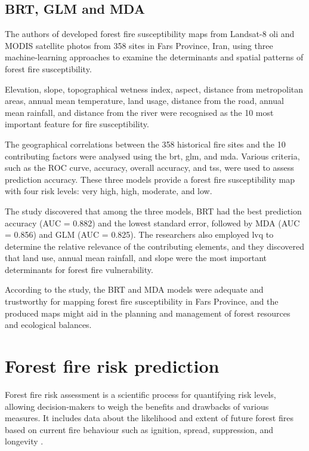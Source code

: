 \subsection{BRT, GLM and MDA}


The authors of \cite{POURGHASEMI2020109321} developed forest fire susceptibility maps from Landsat-8 \gls{oli} and MODIS satellite photos from 358 sites in Fars Province, Iran, using three machine-learning approaches to examine the determinants and spatial patterns of forest fire susceptibility.


Elevation, slope, topographical wetness index, aspect, distance from metropolitan areas, annual mean temperature, land usage, distance from the road, annual mean rainfall, and distance from the river were recognised as the 10 most important feature for fire susceptibility. 


The geographical correlations between the 358 historical fire sites and the 10 contributing factors were analysed using the \gls{brt}, \gls{glm}, and \gls{mda}. Various criteria, such as the ROC curve, accuracy, overall accuracy, and \gls{tss}, were used to assess prediction accuracy. These three models provide a forest fire susceptibility map with four risk levels: very high, high, moderate, and low.


The study discovered that among the three models, BRT had the best prediction accuracy (AUC = 0.882) and the lowest standard error, followed by MDA (AUC = 0.856) and GLM (AUC = 0.825). The researchers also employed \gls{lvq} to determine the relative relevance of the contributing elements, and they discovered that land use, annual mean rainfall, and slope were the most important determinants for forest fire vulnerability.


According to the study, the BRT and MDA models were adequate and trustworthy for mapping forest fire susceptibility in Fars Province, and the produced maps might aid in the planning and management of forest resources and ecological balances.







\section{Forest fire risk prediction}
Forest fire risk assessment is a scientific process for quantifying risk levels, allowing decision-makers to weigh the benefits and drawbacks of various measures. It includes data about the likelihood and extent of future forest fires based on current fire behaviour such as ignition, spread, suppression, and longevity \cite{rs13132513}.

